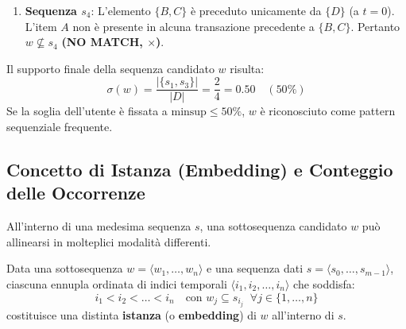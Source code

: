 \begin{example}
\begin{enumerate}
    \item \textbf{Sequenza $s_4$}:
    L'elemento $\{B, C\}$ è preceduto unicamente da $\{D\}$ (a $t=0$). L'item $A$ non è presente in alcuna transazione precedente a $\{B, C\}$.
    Pertanto $w \not\subseteq s_4$ \textbf{(NO MATCH, $\times$)}.
\end{enumerate}

Il supporto finale della sequenza candidato $w$ risulta:
\begin{equation}
\sigma(w) = \frac{|\{s_1, s_3\}|}{|D|} = \frac{2}{4} = 0.50 \quad (50\%)
\end{equation}
Se la soglia dell'utente è fissata a $\text{minsup} \le 50\%$, $w$ è riconosciuto come pattern sequenziale frequente.
\end{example}

\FloatBarrier
\subsection{Concetto di Istanza (Embedding) e Conteggio delle Occorrenze}
All'interno di una medesima sequenza $s$, una sottosequenza candidato $w$ può allinearsi in molteplici modalità differenti.

\begin{definition}
Data una sottosequenza $w = \langle w_1, \dots, w_n \rangle$ e una sequenza dati $s = \langle s_0, \dots, s_{m-1} \rangle$, ciascuna ennupla ordinata di indici temporali $\langle i_1, i_2, \dots, i_n \rangle$ che soddisfa:
\begin{equation}
i_1 < i_2 < \dots < i_n \quad \text{con } w_j \subseteq s_{i_j} \;\; \forall j \in \{1, \dots, n\}
\end{equation}
costituisce una distinta \textbf{istanza} (o \textbf{embedding}) di $w$ all'interno di $s$.
\end{definition}

